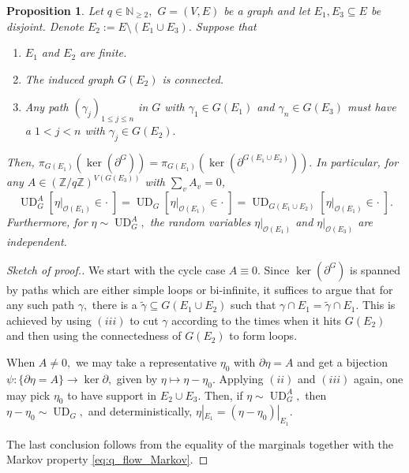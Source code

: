 \documentclass[article,11pt,reqno]{amsart}
\newtheorem{proposition}[theorem]{Proposition}
\begin{document}
\begin{proposition} \label{Separating_Surface_Prop}
Let $q\in\mathbb{N}_{\geq 2},$ $G=(V,E)$ be a graph and let $E_1,E_3\subseteq E$ be disjoint. Denote $E_2:=E\setminus (E_1\cup E_3).$ Suppose that
\begin{enumerate}[label=(\roman*)]
    \item $E_1$ and $E_2$ are finite.
    \item The induced graph $G(E_2)$ is connected.
    \item Any path $(\gamma_j)_{1\leq j\leq n}$ in $G$ with $\gamma_1\in G(E_1)$ and $\gamma_n\in G(E_3)$ must have a $1<j<n$ with $\gamma_j\in G(E_2).$
\end{enumerate}
Then, $\pi_{G(E_1)}(\ker(\partial^G))=\pi_{G(E_1)}(\ker(\partial^{G(E_1\cup E_2)})).$ In particular, for any $A\in (\mathbb{Z}/q\mathbb{Z})^{V(G(E_3))}$ with $\sum_v A_v=0$,
$$\operatorname{UD}^A_G[\eta|_{\mathcal{O}(E_1)} \in \cdot\;]=\operatorname{UD}_{G}[\eta|_{\mathcal{O}(E_1)} \in \cdot\;]=\operatorname{UD}_{G(E_1\cup E_2)}[\eta|_{\mathcal{O}(E_1)}\in\cdot\;].$$ Furthermore, for $\eta\sim \operatorname{UD}^A_G,$ the random variables $\eta|_{\mathcal{O}(E_1)}$ and $\eta|_{\mathcal{O}(E_3)}$ are independent. 
\end{proposition}
\begin{proof}[Sketch of proof.] We start with the cycle case $A\equiv 0.$
Since $\ker(\partial^G)$ is spanned by paths which are either simple loops or bi-infinite, it suffices to argue that for any such path $\gamma,$ there is a $\tilde{\gamma}\subseteq G(E_1\cup E_2)$ such that $\gamma\cap E_1=\tilde{\gamma}\cap E_1.$ This is achieved by using $(iii)$ to cut $\gamma$ according to the times when it hits $G(E_2)$ and then using the connectedness of $G(E_2)$ to form loops.

When $A \neq 0,$ we may take a representative $\eta_0$ with $\partial\eta=A$ and get a bijection $\psi:\{\partial \eta=A\}\to\ker \partial,$ given by $\eta\mapsto \eta-\eta_0.$ Applying $(ii)$ and $(iii)$ again, one may pick $\eta_0$ to have support in $E_2\cup E_3.$ Then, if $\eta\sim \operatorname{UD}^A_G,$ then $\eta-\eta_0\sim \operatorname{UD}_{G},$ and deterministically, $\eta|_{E_1}=(\eta-\eta_0)|_{E_1}$.

The last conclusion follows from the equality of the marginals together with the Markov property \eqref{eq:q_flow_Markov}.
\end{proof}
\end{document}
